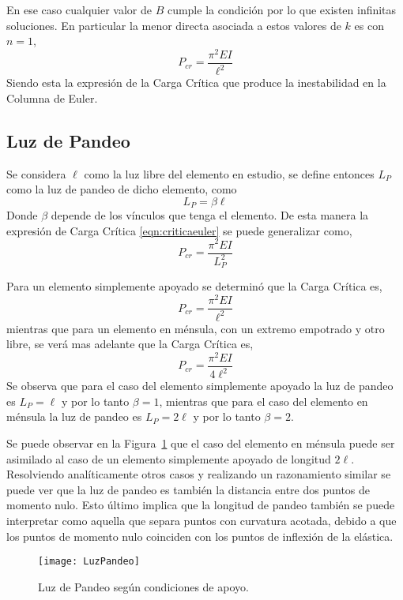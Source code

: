 En ese caso cualquier valor de $B$ cumple la condición por lo que existen infinitas soluciones. En particular la menor directa asociada a estos valores de $k$ es con $n=1$,
\begin{equation}\label{eqn:criticaeuler}
\boxed{P_{cr} = \frac{\pi^2 E I}{\ell^2}}
\end{equation}
Siendo esta la expresión de la Carga Crítica que produce la inestabilidad en la Columna de Euler.

\subsection{Luz de Pandeo}

Se considera $\ell$ como la luz libre del elemento en estudio, se define entonces $L_P$ como la luz de pandeo de dicho elemento, como
\begin{equation}
L_P=\beta\ell
\end{equation}
Donde $\beta$ depende de los vínculos que tenga el elemento. De esta manera la expresión de Carga Crítica \eqref{eqn:criticaeuler} se puede generalizar como,
\begin{equation}\label{eqn:criticageneral}
\boxed{P_{cr} = \frac{\pi^2 E I}{L_P^2}}
\end{equation}

Para un elemento simplemente apoyado se determinó que la Carga Crítica es,
$$P_{cr} = \frac{\pi^2 E I}{\ell^2}$$
mientras que para un elemento en ménsula, con un extremo empotrado y otro libre, se verá mas adelante que la Carga Crítica es,
$$P_{cr} = \frac{\pi^2 E I}{4\ell^2}$$
Se observa que para el caso del elemento simplemente apoyado la luz de pandeo es $L_P=\ell$ y por lo tanto $\beta=1$, mientras que para el caso del elemento en ménsula la luz de pandeo es $L_P=2\ell$ y por lo tanto $\beta=2$. 

Se puede observar en la Figura~\ref{fig:luzpandeo} que el caso del elemento en ménsula puede ser asimilado al caso de un elemento simplemente apoyado de longitud $2\ell$. Resolviendo analíticamente otros casos y realizando un razonamiento similar se puede ver que la luz de pandeo es también la distancia entre dos puntos de momento nulo. Esto último implica que la longitud de pandeo también se puede interpretar como aquella que separa puntos con curvatura acotada, debido a que los puntos de momento nulo coinciden con los puntos de inflexión de la elástica.

\begin{figure}[htb]
	\centering
	\texttt{[image: LuzPandeo]}
	\caption{Luz de Pandeo según condiciones de apoyo.}
	\label{fig:luzpandeo}
\end{figure}

